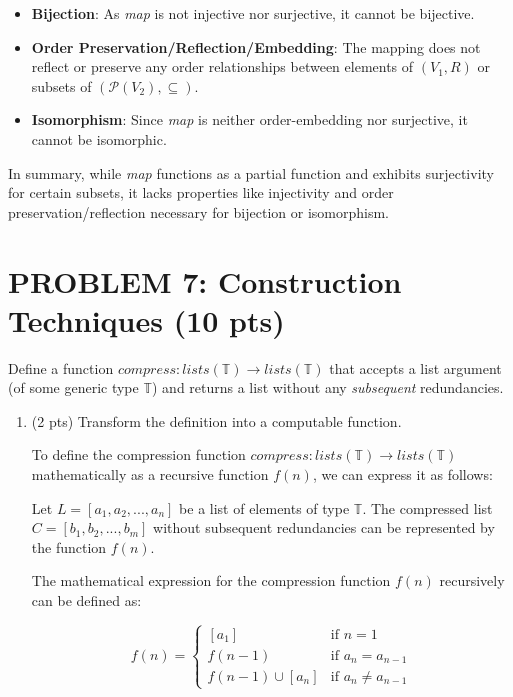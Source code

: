 \documentclass[12pt]{article}
\begin{document}
\begin{spacing}{1.5}
\begin{itemize}
		\item \textbf{Bijection}: As \textit{map} is not injective nor surjective, it cannot be bijective.
		      
		\item \textbf{Order Preservation/Reflection/Embedding}: The mapping does not reflect or preserve any order relationships between elements of $(V_1, R)$ or subsets of $(\mathcal{P}(V_2), \subseteq)$.
		      
		\item \textbf{Isomorphism}: Since \textit{map} is neither order-embedding nor surjective, it cannot be isomorphic.
	\end{itemize}
	
	\noindent In summary, while \textit{map} functions as a partial function and exhibits surjectivity for certain subsets, it lacks properties like injectivity and order preservation/reflection necessary for bijection or isomorphism.
		    
	\newpage
	\section*{PROBLEM 7: Construction Techniques (10 pts)}
	
	Define a function $compress : lists(\mathbb{T}) \rightarrow lists(\mathbb{T})$ that accepts a list argument (of some generic type $\mathbb{T}$) and returns a list without any \textit{subsequent} redundancies.
	
	\begin{enumerate}
		\item (2 pts) Transform the definition into a computable function.
		      
		      To define the compression function $compress : lists(\mathbb{T}) \rightarrow lists(\mathbb{T})$ mathematically as a recursive function $f(n)$, we can express it as follows:
		      
		      Let $L = [a_1, a_2, ..., a_n]$ be a list of elements of type $\mathbb{T}$.
		      The compressed list $C = [b_1, b_2, ..., b_m]$ without subsequent redundancies can be represented by the function $f(n)$.
		          
		      The mathematical expression for the compression function $f(n)$ recursively can be defined as:
		              
		      $$f(n)=\begin{cases}
		      [a_1]&\text{if }n=1\\
		      f(n-1)&\text{if }a_n=a_{n-1}\\
		      f(n-1)\cup [a_n]&\text{if }a_n\neq a_{n-1}
		\end{cases}$$
		            

\end{enumerate}
\end{spacing}
\end{document}
